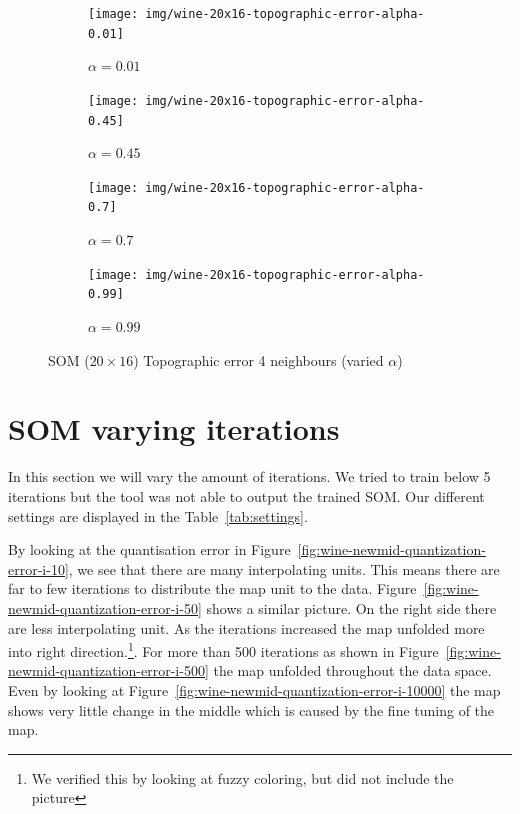 \documentclass{acm_proc_article-sp}
\begin{document}
\begin{figure}
\centering
    \centering
    \begin{subfigure}[b]{0.24\linewidth}
        \texttt{[image: img/wine-20x16-topographic-error-alpha-0.01]}
        \caption{$\alpha=0.01$}
        \label{fig:wine-20x16-topographic-error-alpha-0.01}
    \end{subfigure}
    \begin{subfigure}[b]{0.24\linewidth}
        \texttt{[image: img/wine-20x16-topographic-error-alpha-0.45]}
        \caption{$\alpha=0.45$}
        \label{fig:wine-20x16-topographic-error-alpha-0.45}
    \end{subfigure}
    \begin{subfigure}[b]{0.24\linewidth}
        \texttt{[image: img/wine-20x16-topographic-error-alpha-0.7]}
        \caption{$\alpha=0.7$}
        \label{fig:wine-20x16-topographic-error-alpha-0.7}
    \end{subfigure}
    \begin{subfigure}[b]{0.24\linewidth}
        \texttt{[image: img/wine-20x16-topographic-error-alpha-0.99]}
        \caption{$\alpha=0.99$}
        \label{fig:wine-20x16-topographic-error-alpha-0.99}
    \end{subfigure}
    \caption{SOM ($20\times16$) Topographic error 4 neighbours (varied $\alpha$)}
    \label{fig:wine-20x16-topographic-error-alpha}
\end{figure}

\section{SOM varying iterations}

In this section we will vary the amount of iterations. We tried to train below 5 iterations but the tool was not able to output the trained SOM.
Our different settings are displayed in the Table~\ref{tab:settings}.

By looking at the quantisation error in Figure~\ref{fig:wine-newmid-quantization-error-i-10}, 
we see that there are many interpolating units. This means there are far to few iterations to
distribute the map unit to the data. Figure~\ref{fig:wine-newmid-quantization-error-i-50} shows
a similar picture. On the right side there are less interpolating unit. As the iterations increased
the map unfolded more into right direction.\footnote{We verified this by looking at fuzzy coloring, but did not include the picture}.
For more than 500 iterations as shown in Figure~\ref{fig:wine-newmid-quantization-error-i-500} the map unfolded throughout the data space.
Even by looking at Figure~\ref{fig:wine-newmid-quantization-error-i-10000} the map shows very little change in the middle which
is caused by the fine tuning of the map.
\end{document}
